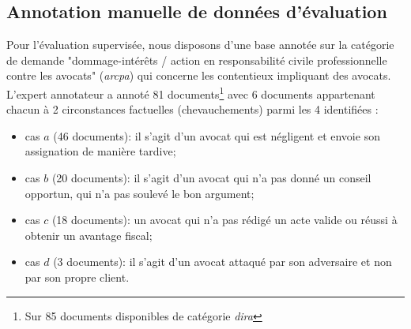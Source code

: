 \subsection{Annotation manuelle de données d'évaluation}
Pour l'évaluation supervisée, nous disposons d'une base annotée sur la catégorie de demande "dommage-intérêts / action en responsabilité civile professionnelle contre les avocats" (\textit{arcpa}) qui concerne les contentieux impliquant des avocats.  L'expert annotateur a annoté 81 documents\footnote{Sur 85 documents disponibles de catégorie \textit{dira}} avec 6 documents appartenant chacun à 2 circonstances factuelles (chevauchements) parmi les 4 identifiées :
\begin{itemize}
\item cas $a$ (46 documents): il s'agit d'un avocat qui est négligent et envoie son assignation de manière tardive; %
\item cas $b$ (20 documents): il s'agit d'un avocat qui n'a pas donné un conseil opportun, qui n'a pas soulevé le bon argument;
\item cas $c$ (18 documents): un avocat qui n'a pas rédigé un acte valide ou réussi à obtenir un avantage fiscal; %
\item cas $d$ (3 documents): il s'agit d'un avocat attaqué par son adversaire et non par son propre client.
\end{itemize}



